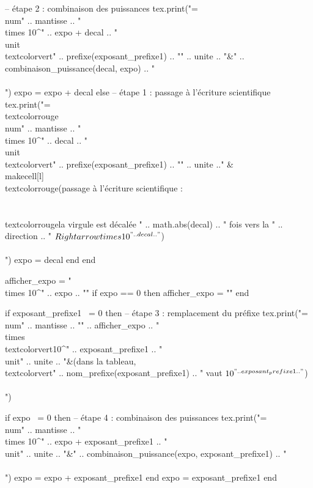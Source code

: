 \documentclass[../Cours.tex]{subfiles}
\begin{document}
\begin{luacode}
                -- étape 2 : combinaison des puissances
                tex.print("=\\num{" .. mantisse .. "} \\times 10^{" .. expo + decal .. "}~\\unit{\\textcolor{vert}{" .. prefixe(exposant_prefixe1) .. "}" .. unite .. "}&" .. combinaison_puissance(decal, expo) .. "\\\\")
                expo = expo + decal
            else
                -- étape 1 : passage à l'écriture scientifique
                tex.print("=\\textcolor{rouge}{\\num{" .. mantisse .. "} \\times 10^{" .. decal .. "}}~\\unit{\\textcolor{vert}{" .. prefixe(exposant_prefixe1) .. "}" .. unite  .."} & \\makecell[l]{\\textcolor{rouge}{(passage à l'écriture scientifique :} \\\\ \\textcolor{rouge}{la virgule est décalée " .. math.abs(decal) .. " fois vers la " .. direction .. " $\\Rightarrow \\times 10^{" .. decal .. "}$)}}\\\\")
                expo = decal
            end
        end

        afficher_expo = "\\times 10^{" .. expo .. "}"
        if expo == 0 then afficher_expo = "" end

        if exposant_prefixe1 ~= 0 then
            -- étape 3 : remplacement du préfixe
            tex.print("=\\num{" .. mantisse .. "}" .. afficher_expo .. " \\times \\textcolor{vert}{10^{" .. exposant_prefixe1 .. "}}~\\unit{" .. unite .. "}&(dans la tableau, \\textcolor{vert}{" .. nom_prefixe(exposant_prefixe1) .. " vaut $10^{" .. exposant_prefixe1 .. "}$})\\\\")
    
            if expo ~= 0 then
                -- étape 4 : combinaison des puissances
                tex.print("=\\num{" .. mantisse .. "} \\times 10^{" .. expo + exposant_prefixe1 .. "}~\\unit{" .. unite .. "}&" .. combinaison_puissance(expo, exposant_prefixe1) .. "\\\\")
                expo = expo + exposant_prefixe1
            end
            expo = exposant_prefixe1
        end


\end{luacode}
\end{document}
